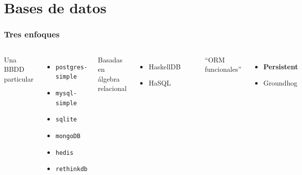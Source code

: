\documentclass{beamer}
\begin{document}
\section{Bases de datos}

\begin{frame}[fragile]
\frametitle{Tres enfoques}
\begin{columns}
Una BBDD particular
\begin{itemize}
\item {\tt postgres-simple}
\item {\tt mysql-simple}
\item {\tt sqlite}
\item {\tt mongoDB}
\item {\tt hedis}
\item {\tt rethinkdb}
\end{itemize}
Basadas en álgebra relacional
\begin{itemize}
\item HaskellDB
\item HaSQL
\end{itemize}

\

``ORM funcionales''
\begin{itemize}
\item {\bf Persistent}
\item Groundhog
\end{itemize}
\end{columns}
\end{frame}
\end{document}

